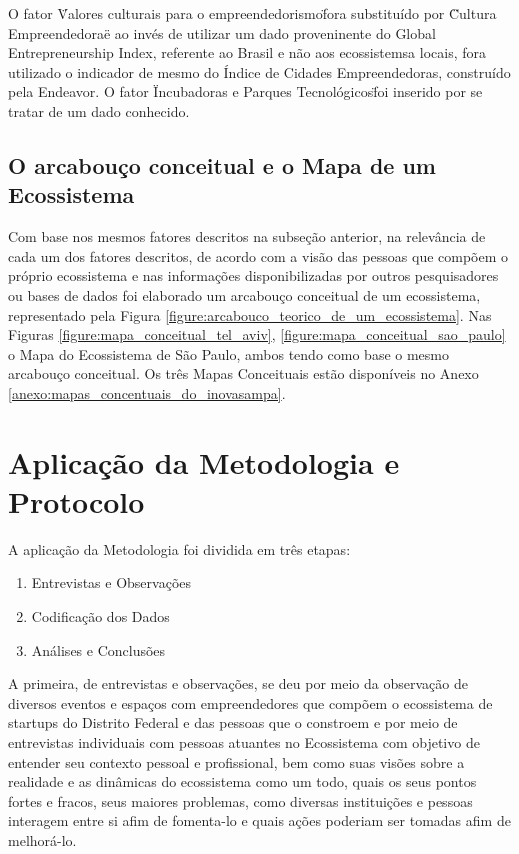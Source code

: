 O fator \"Valores culturais para o empreendedorismo\" fora substituído por \"Cultura Empreendedora\" e ao invés de utilizar um dado proveninente do Global Entrepreneurship Index, referente ao Brasil e não aos ecossistemsa locais, fora utilizado o indicador de mesmo do Índice de Cidades Empreendedoras, construído pela Endeavor. O fator \"Incubadoras e Parques Tecnológicos\" foi inserido por se tratar de um dado conhecido. 

\subsection{O arcabouço conceitual e o Mapa de um Ecossistema}
\label{subsection:arcabouco_conceitual_e_modelo}

Com base nos mesmos fatores descritos na subseção anterior, na relevância de cada um dos fatores descritos, de acordo com a visão das pessoas que compõem o próprio ecossistema e nas informações disponibilizadas por outros pesquisadores ou bases de dados foi elaborado um arcabouço conceitual de um ecossistema, representado pela Figura \ref{figure:arcabouco_teorico_de_um_ecossistema}. Nas Figuras \ref{figure:mapa_conceitual_tel_aviv}, \ref{figure:mapa_conceitual_sao_paulo} o Mapa do Ecossistema de São Paulo, ambos tendo como base o mesmo arcabouço conceitual. Os três Mapas Conceituais estão disponíveis no Anexo \ref{anexo:mapas_concentuais_do_inovasampa}.

\section{Aplicação da Metodologia e Protocolo}
\label{section:aplicacao_da_metodologia}

A aplicação da Metodologia foi dividida em três etapas:

\begin{enumerate}
  \item Entrevistas e Observações
  \item Codificação dos Dados
  \item Análises e Conclusões
\end{enumerate}

A primeira, de entrevistas e observações, se deu por meio da observação de diversos eventos e espaços com empreendedores que compõem o ecossistema de startups do Distrito Federal e das pessoas que o constroem e por meio de entrevistas individuais com pessoas atuantes no Ecossistema com objetivo de entender seu contexto pessoal e profissional, bem como suas visões sobre a realidade e as dinâmicas do ecossistema como um todo, quais os seus pontos fortes e fracos, seus maiores problemas, como diversas instituições e pessoas interagem entre si afim de fomenta-lo e quais ações poderiam ser tomadas afim de melhorá-lo.

